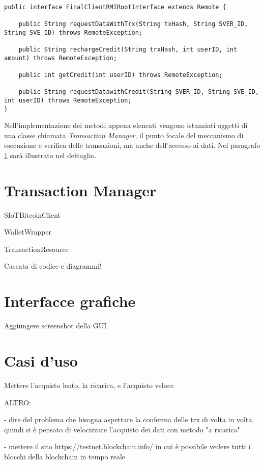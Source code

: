 \begin{lstlisting}[caption={FinalClientRMIRootInterface.java},label={FinalClientRMIRootInterface},style={c}]

public interface FinalClientRMIRootInterface extends Remote {
    
    public String requestDataWithTrx(String txHash, String SVER_ID, String SVE_ID) throws RemoteException;
    
    public String rechargeCredit(String trxHash, int userID, int amount) throws RemoteException;
    
    public int getCredit(int userID) throws RemoteException;
    
    public String requestDatawithCredit(String SVER_ID, String SVE_ID, int userID) throws RemoteException;
}

\end{lstlisting}

Nell'implementazione dei metodi appena elencati vengono istanziati oggetti di una classe chiamata \textit{Transaction Manager}, il punto focale del meccanismo di esecuzione e verifica delle transazioni, ma anche dell'accesso ai dati. Nel paragrafo \ref{c:integr:trxmanager} sarà illustrato nel dettaglio.

\section{Transaction Manager}
\label{c:integr:trxmanager}

SIoTBitcoinClient

WalletWrapper

TransactionResource


Cascata di codice e diagrammi!

\section{Interfacce grafiche}
\label{c:integr:gui}

Aggiungere screenshot della GUI


\section{Casi d'uso}
\label{c:integr:useCase}

Mettere l'acquisto lento, la ricarica, e l'acquisto veloce


ALTRO:

- dire del problema che bisogna aspettare la conferma delle trx di volta in volta, quindi si è pensato di velocizzare l'acquisto dei dati con metodo "a ricarica".

- mettere il sito https://testnet.blockchain.info/ in cui è possibile vedere tutti i blocchi della blockchain in tempo reale